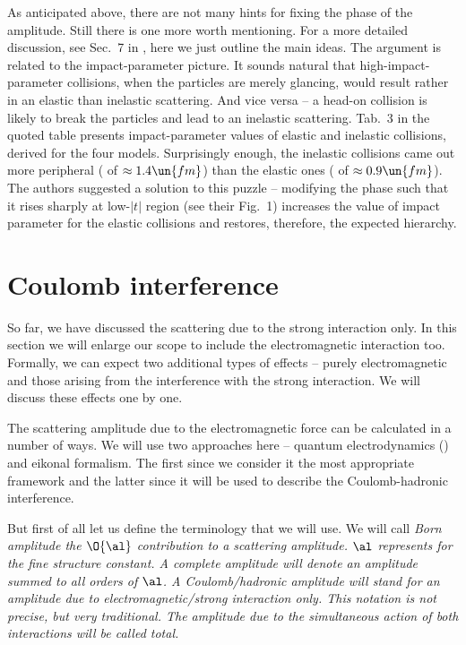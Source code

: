 As anticipated above, there are not many hints for fixing the phase of the amplitude. Still there is one more worth mentioning. For a more detailed discussion, see Sec.~7 in , here we just outline the main ideas. The argument is related to the impact-parameter picture. It sounds natural that high-impact-parameter collisions, when the particles are merely glancing, would result rather in an elastic than inelastic scattering. And vice versa -- a head-on collision is likely to break the particles and lead to an inelastic scattering. Tab.~3 in the quoted table presents  impact-parameter values of elastic and inelastic collisions, derived for the four models. Surprisingly enough, the inelastic collisions came out more peripheral ( of $\approx 1.4\un{fm}$) than the elastic ones ( of $\approx 0.9\un{fm}$). The authors suggested a solution to this puzzle -- modifying the phase such that it rises sharply at low-$|t|$ region (see their Fig.~1) increases the  value of impact parameter for the elastic collisions and restores, therefore, the expected hierarchy.

\section[el coulomb]{Coulomb interference}

So far, we have discussed the scattering due to the strong interaction only. In this section we will enlarge our scope to include the electromagnetic interaction too. Formally, we can expect two additional types of effects -- purely electromagnetic and those arising from the interference with the strong interaction. We will discuss these effects one by one.

The scattering amplitude due to the electromagnetic force can be calculated in a number of ways. We will use two approaches here -- quantum electrodynamics () and eikonal formalism. The first since we consider it the most appropriate framework and the latter since it will be used to describe the Coulomb-hadronic interference.

But first of all let us define the terminology that we will use. We will call \em{Born amplitude} the $\O{\al}$ contribution to a scattering amplitude. $\al$ represents for the fine structure constant. A \em{complete} amplitude will denote an amplitude summed to all orders of $\al$. A \em{Coulomb}/\em{hadronic} amplitude will stand for an amplitude due to electromagnetic/strong interaction only. This notation is not precise, but very traditional. The amplitude due to the simultaneous action of both interactions will be called \em{total}.

